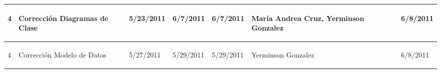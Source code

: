 \begin{center}
\begin{longtable}{|p{}|p{}|p{}|p{}|p{}|p{}|p{}|p{}|}
{\begin{center} 4 \end{center}} & 
{\begin{center} Corrección Diagramas de Clase \end{center}} & 
{\begin{center} 5/23/2011 \end{center}} & 
{\begin{center} 6/7/2011 \end{center}} & 
{\begin{center} 6/7/2011 \end{center}} & 
{\begin{center} María Andrea Cruz, Yerminson Gonzalez \end{center}} & 
{\begin{center}  \end{center}} & 
{\begin{center} 6/8/2011 \end{center}}\\
\hline

{\begin{center} 4 \end{center}} & 
{\begin{center} Corrección Modelo de Datos \end{center}} & 
{\begin{center} 5/27/2011 \end{center}} & 
{\begin{center} 5/29/2011 \end{center}} & 
{\begin{center} 5/29/2011 \end{center}} & 
{\begin{center} Yerminson Gonzalez \end{center}} & 
{\begin{center}  \end{center}} & 
{\begin{center} 6/8/2011 \end{center}}\\
\hline
		

\end{longtable}
\end{center}
